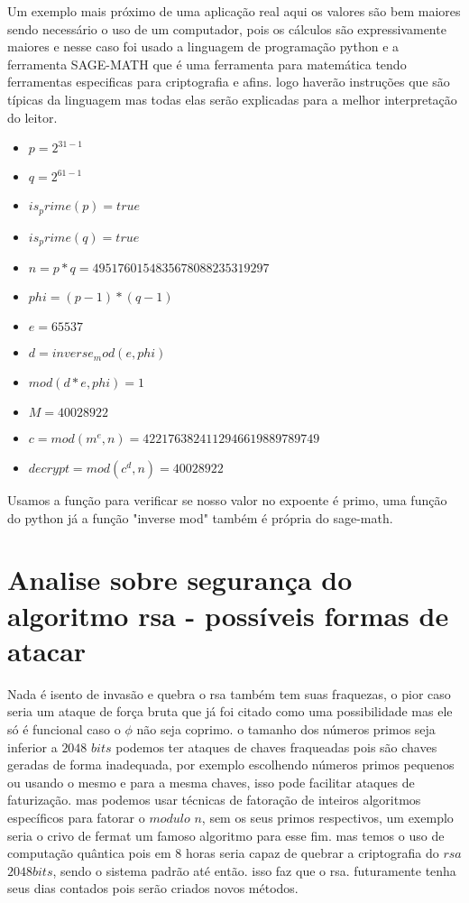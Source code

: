 \documentclass{article}
\begin{document}
\caption{Um exemplo mais próximo de uma aplicação real aqui os valores são bem maiores sendo necessário o uso de um computador, pois os cálculos são expressivamente maiores e nesse caso foi usado a linguagem de programação python e a ferramenta SAGE-MATH que é uma ferramenta para matemática tendo ferramentas especificas para criptografia e afins. logo haverão instruções que são típicas da linguagem mas todas elas serão explicadas para a melhor interpretação do leitor. 
}
\begin{itemize}
\centering
\item   $p = 2^{31-1}$
\item 	$q = 2^{61-1}$
\item 	${is_prime}(p) = true$
\item	$is_prime(q) = true$
\item 	$n = p*q = 4951760154835678088235319297$
\item 	$phi = (p-1)*(q-1)$
\item 	$e = 65537$
\item 	$d = inverse_mod(e,phi)$
\item 	$mod(d*e,phi) = 1$
\item 	$M = 40028922$
\item 	$c = mod(m^e,n) = 4221763824112946619889789749$
\item   $decrypt = mod(c^d,n) = 40028922$
\end{itemize}

\caption{Usamos a função para verificar se nosso valor no expoente é primo, uma função do python já a função "inverse mod" também é própria do sage-math.
}

\section{Analise sobre segurança do algoritmo rsa - possíveis formas de atacar}
Nada é isento de invasão e quebra o rsa também tem suas fraquezas, o pior caso seria um ataque de força bruta que já foi citado como uma possibilidade mas ele só é funcional caso o $\phi$ não seja coprimo. o tamanho dos números primos seja inferior a $2048$ $bits$ podemos ter ataques de chaves fraqueadas pois são chaves geradas de forma inadequada, por exemplo escolhendo números primos pequenos ou usando o mesmo e para a mesma chaves, isso pode facilitar ataques de faturização. mas podemos usar técnicas de fatoração de inteiros algoritmos específicos para fatorar o $modulo$ $n$, sem os seus primos respectivos, um exemplo seria o crivo de fermat um famoso algoritmo para esse fim. mas temos o uso de computação quântica pois em 8 horas seria capaz de quebrar a criptografia do $rsa$ $2048 bits$, sendo o sistema padrão até então. isso faz que o rsa. futuramente tenha seus dias contados pois serão criados novos métodos. 
\end{document}
